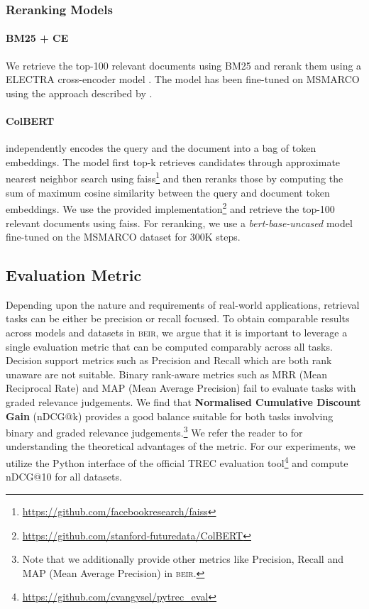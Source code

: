 \documentclass[11pt]{article}
\newcommand{\custo}[1]{\textsc{\normalsize #1}}
\newcommand{\beir}{\custo{beir}\xspace}
\begin{document}
\subsubsection{Reranking Models}
\paragraph{BM25 + CE}\label{sec:electra_model}  We retrieve the top-100 relevant documents using BM25 and rerank them using a ELECTRA cross-encoder model \cite{Clark2020ELECTRA}. The model has been fine-tuned on MSMARCO \cite{nguyen2016ms} using the approach described by \cite{nogueira2020passage}. 


\paragraph{ColBERT} \cite{10.1145/3397271.3401075} independently encodes the query and the document into a bag of token embeddings. The model first top-k retrieves candidates through approximate nearest neighbor search using faiss\footnote{\href{https://github.com/facebookresearch/faiss}{https://github.com/facebookresearch/faiss}} \cite{JDH17} and then reranks those by computing the sum of maximum cosine similarity between the query and document token embeddings. We use the provided implementation\footnote{\href{https://github.com/stanford-futuredata/ColBERT}{https://github.com/stanford-futuredata/ColBERT}} and retrieve the top-100 relevant documents using faiss. For reranking, we use a \textit{bert-base-uncased} model fine-tuned on the MSMARCO dataset for 300K steps.


\subsection{Evaluation Metric}

Depending upon the nature and requirements of real-world applications, retrieval tasks can be either be precision or recall focused. To obtain comparable results across models and datasets in \beir, we argue that it is important to leverage a single evaluation metric that can be computed comparably across all tasks. Decision support metrics such as Precision and Recall which are both rank unaware are not suitable. Binary rank-aware metrics such as MRR (Mean Reciprocal Rate) and MAP (Mean Average Precision) fail to evaluate tasks with graded relevance judgements. We find that \textbf{Normalised Cumulative Discount Gain} (nDCG@k) provides a good balance suitable for both tasks involving binary and graded relevance judgements.\footnote{Note that we additionally provide other metrics like Precision, Recall and MAP (Mean Average Precision) in \beir.} We refer the reader to  for understanding the theoretical advantages of the metric. For our experiments, we utilize the Python interface of the official TREC evaluation tool\footnote{\href{https://github.com/cvangysel/pytrec\_eval}{https://github.com/cvangysel/pytrec\_eval}} \cite{VanGysel2018pytreceval} and compute nDCG@10 for all datasets.
\end{document}
